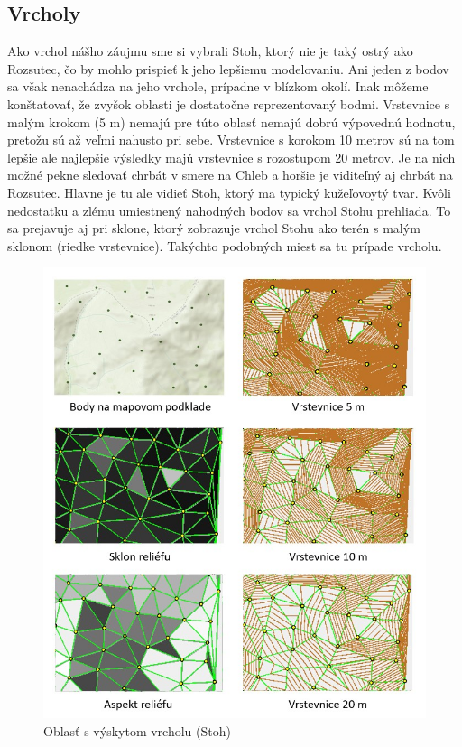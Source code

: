 \documentclass[12pt]{article}
\begin{document}
\subsection*{Vrcholy}
Ako vrchol nášho záujmu sme si vybrali Stoh, ktorý nie je taký ostrý ako Rozsutec, čo by mohlo prispieť k jeho lepšiemu modelovaniu. Ani jeden z bodov sa však nenachádza na jeho vrchole, prípadne v blízkom okolí. Inak môžeme konštatovať, že zvyšok oblasti je dostatočne reprezentovaný bodmi. Vrstevnice s malým krokom (5 m) nemajú pre túto oblasť nemajú dobrú výpovednú hodnotu, pretožu sú až veľmi nahusto pri sebe. Vrstevnice s korokom 10 metrov sú na tom lepšie ale najlepšie výsledky majú vrstevnice s rozostupom 20 metrov. Je na nich možné pekne sledovať chrbát v smere na Chleb a horšie je viditeľný aj chrbát na Rozsutec. Hlavne je tu ale vidieť Stoh, ktorý ma typický kužeľovoytý tvar. Kvôli nedostatku a zlému umiestnený nahodných bodov sa vrchol Stohu prehliada. To sa prejavuje aj pri sklone, ktorý zobrazuje vrchol Stohu ako terén s malým sklonom (riedke vrstevnice). Takýchto podobných miest sa tu prípade vrcholu.

\begin{figure}[h]
    \centering
    \includegraphics[width=0.6\linewidth]{latex/images/vrchol.jpg}
    \caption{Oblasť s výskytom vrcholu (Stoh)}
    \label{fig:enter-label}
\end{figure}
\end{document}
